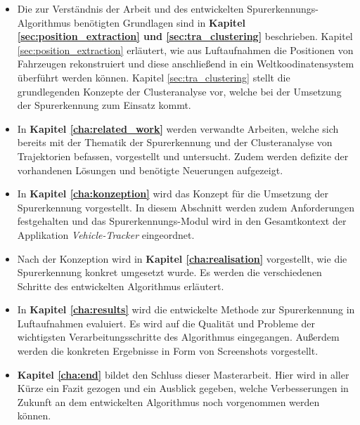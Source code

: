 \begin{itemize}
    \item Die zur Verständnis der Arbeit und des entwickelten Spurerkennungs-Algorithmus benötigten
            Grundlagen sind in \textbf{Kapitel \ref{sec:position_extraction} und \ref{sec:tra_clustering}} beschrieben.
            Kapitel \ref{sec:position_extraction} erläutert, wie aus Luftaufnahmen die Positionen von Fahrzeugen
            rekonstruiert und diese anschließend in ein Weltkoodinatensystem überführt werden können.
            Kapitel \ref{sec:tra_clustering} stellt die grundlegenden Konzepte der Clusteranalyse vor, welche
            bei der Umsetzung der Spurerkennung zum Einsatz kommt.
    \item In \textbf{Kapitel \ref{cha:related_work}} werden verwandte Arbeiten, welche sich bereits mit
            der Thematik der Spurerkennung und der Clusteranalyse von Trajektorien befassen, vorgestellt und untersucht.
            Zudem werden defizite der vorhandenen Lösungen und benötigte Neuerungen aufgezeigt.
    \item In \textbf{Kapitel \ref{cha:konzeption}} wird das Konzept für die Umsetzung der Spurerkennung vorgestellt.
            In diesem Abschnitt werden zudem Anforderungen festgehalten und das Spurerkennungs-Modul wird in den Gesamtkontext
            der Applikation \textit{Vehicle-Tracker} eingeordnet.
    \item Nach der Konzeption wird in \textbf{Kapitel \ref{cha:realisation}} vorgestellt, wie die Spurerkennung konkret
            umgesetzt wurde. Es werden die verschiedenen Schritte des entwickelten Algorithmus erläutert.
    \item In \textbf{Kapitel \ref{cha:results}} wird die entwickelte Methode zur Spurerkennung in Luftaufnahmen evaluiert.
            Es wird auf die Qualität und Probleme der wichtigsten Verarbeitungsschritte des Algorithmus eingegangen.
            Außerdem werden die konkreten Ergebnisse in Form von Screenshots vorgestellt.
    \item \textbf{Kapitel \ref{cha:end}} bildet den Schluss dieser Masterarbeit. Hier wird in aller Kürze
            ein Fazit gezogen und ein Ausblick gegeben, welche Verbesserungen in Zukunft an dem entwickelten
            Algorithmus noch vorgenommen werden können.
\end{itemize}

